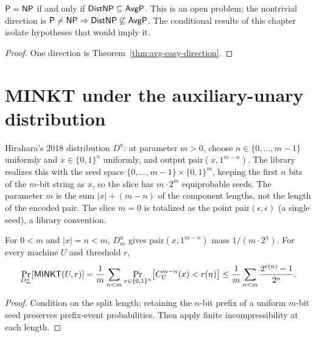 \begin{theorem}
  \label{thm:avg-heuristica}
  \notready
  $\mathsf{P} = \mathsf{NP}$ if and only if $\mathsf{DistNP} \subseteq \mathsf{AvgP}$. This is
  an open problem; the nontrivial direction is $\mathsf{P} \neq \mathsf{NP} \Rightarrow
  \mathsf{DistNP} \not\subseteq \mathsf{AvgP}$. The conditional results of this chapter
  isolate hypotheses that would imply it.
\end{theorem}
\begin{proof}
  One direction is Theorem~\ref{thm:avg-easy-direction}.
\end{proof}

\section{MINKT under the auxiliary-unary distribution}

\begin{definition}
  \label{def:avg-auxiliary-unary}
  \leanok
  Hirahara's 2018 distribution $D^u$: at parameter $m > 0$, choose
  $n \in \{0, \dots, m-1\}$ uniformly and $x \in \{0,1\}^n$ uniformly, and output
  $\mathrm{pair}(x, 1^{m-n})$. The library realizes this with the seed space
  $\{0, \dots, m-1\} \times \{0,1\}^m$, keeping the first $n$ bits of the
  $m$-bit string as $x$, so the slice has $m \cdot 2^m$ equiprobable seeds. The
  parameter $m$ is the sum $|x| + (m-n)$ of the component lengths, not the
  length of the encoded pair. The slice $m = 0$ is totalized as the point
  $\mathrm{pair}(\epsilon, \epsilon)$ (a single seed), a library convention.
\end{definition}

\begin{lemma}
  \label{lem:avg-auxiliary-unary-minkt}
  \leanok
  For $0 < m$ and $|x| = n < m$, $D^u_m$ gives $\mathrm{pair}(x, 1^{m-n})$ mass
  $1/(m \cdot 2^n)$. For every machine $U$ and threshold $r$,
  \[
    \Pr_{D^u_m}[\mathsf{MINKT}(U,r)] = \frac{1}{m}\sum_{n<m}
      \Pr_{x \in \{0,1\}^n}\bigl[C^{m-n}_U(x) < r(n)\bigr]
    \le \frac{1}{m}\sum_{n<m} \frac{2^{r(n)}-1}{2^n}.
  \]
\end{lemma}
\begin{proof}
  \leanok
  Condition on the split length; retaining the $n$-bit prefix of a uniform
  $m$-bit seed preserves prefix-event probabilities. Then apply finite
  incompressibility at each length.
\end{proof}

